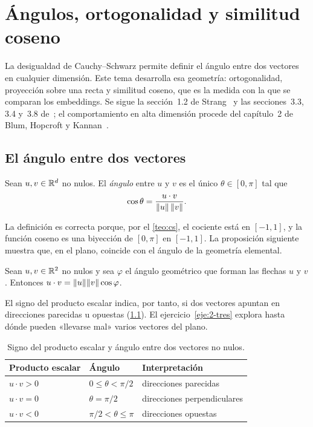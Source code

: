 \chapter{Ángulos, ortogonalidad y similitud coseno}
\label{tema:2}

La desigualdad de Cauchy--Schwarz permite definir el ángulo entre dos vectores en cualquier dimensión. Este tema desarrolla esa geometría: ortogonalidad, proyección sobre una recta y similitud coseno, que es la medida con la que se comparan los embeddings. Se sigue la sección~1.2 de Strang~\cite{strang} y las secciones~3.3, 3.4 y~3.8 de~\cite{mml}; el comportamiento en alta dimensión procede del capítulo~2 de Blum, Hopcroft y Kannan~\cite{bhk}.

\section{El ángulo entre dos vectores}

\begin{definicion}[Ángulo]\label{def:angulo}
Sean $u,v\in\mathbb{R}^{d}$ no nulos. El \emph{ángulo} entre $u$ y $v$ es el único $\theta\in[0,\pi]$ tal que
\[
\cos\theta=\frac{u\cdot v}{\lVert u\rVert\,\lVert v\rVert}.
\]
\end{definicion}

La definición es correcta porque, por el \cref{teo:cs}, el cociente está en $[-1,1]$, y la función coseno es una biyección de $[0,\pi]$ en $[-1,1]$. La proposición siguiente muestra que, en el plano, coincide con el ángulo de la geometría elemental.

\begin{proposicion}\label{prop:ley-coseno}
Sean $u,v\in\mathbb{R}^{2}$ no nulos y sea $\varphi$ el ángulo geométrico que forman las flechas $u$ y $v$. Entonces $u\cdot v=\lVert u\rVert\lVert v\rVert\cos\varphi$.
\end{proposicion}

El signo del producto escalar indica, por tanto, si dos vectores apuntan en direcciones parecidas u opuestas (\cref{tab:signo}). El ejercicio~\ref{eje:2-tres} explora hasta dónde pueden «llevarse mal» varios vectores del plano.

\begin{table}[h]
\centering\small
\caption{Signo del producto escalar y ángulo entre dos vectores no nulos.}\label{tab:signo}
\begin{tabular}{@{}lll@{}}
\toprule
Producto escalar & Ángulo & Interpretación \\
\midrule
$u\cdot v>0$ & $0\le\theta<\pi/2$ & direcciones parecidas \\
$u\cdot v=0$ & $\theta=\pi/2$ & direcciones perpendiculares \\
$u\cdot v<0$ & $\pi/2<\theta\le\pi$ & direcciones opuestas \\
\bottomrule
\end{tabular}
\end{table}

